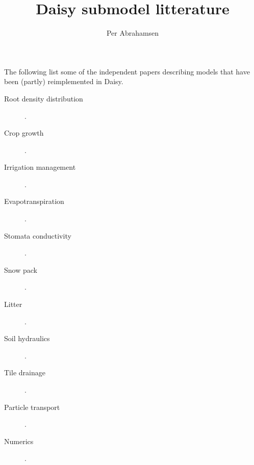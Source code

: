 \documentclass[a4paper]{article}
\begin{document}
\title{Daisy submodel litterature}
\author{Per Abrahamsen}

\maketitle{}

The following list some of the independent papers describing models
that have been (partly) reimplemented in Daisy.
\begin{description}
\item[Root density distribution] \cite{gp74}.
\item[Crop growth] \cite{vries-maize,pf1997simple}.
\item[Irrigation management] \cite{markvand}.
\item[Evapotranspiration] \cite{FAO-PM, kjaersgaard2008crop}.
\item[Stomata conductivity] \cite{bb87, leuning95, gs2002, Ahmadi20091541}.
\item[Snow pack] \cite{snow1956}.
\item[Litter] \cite{scopel1998, macena2003, scopel2004}.
\item[Soil hydraulics] \cite{richardseq, burdine1953,
    campbell1974simple, mualem1976, hypres, Cosby, MvGp}.
\item[Tile drainage] \cite{hooghoudt,molenwesseling,moody,wesseling}.
\item[Particle transport] \cite{macro-colloid, mmax, styczen88,
    EUROSEM, park82, hairsine91, brown87}.
\item[Numerics] \cite{nelder1965simplex}.
\end{description}

\printbibliography[heading=subbibliography]
\end{document}
